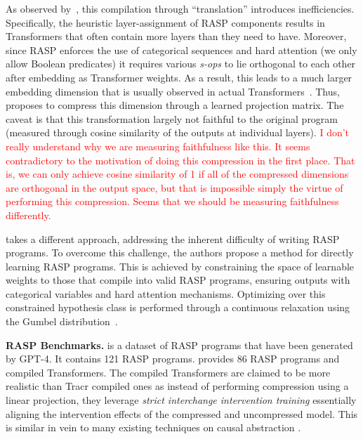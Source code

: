 \documentclass{article}
\begin{document}
As observed by~\cite{lindner_tracr_2023}, this compilation through ``translation'' introduces
inefficiencies. Specifically, the heuristic layer-assignment of RASP components results in
Transformers that often contain more layers than they need to have. Moreover, since RASP
enforces the use of categorical sequences and hard attention (we only allow Boolean
predicates) it requires various \textit{s-ops} to lie orthogonal to each other after
embedding as Transformer weights. As a result, this leads to a much larger embedding dimension
that is usually observed in actual Transformers~\citep{elhage_toy_2022}. 
Thus, \cite{lindner_tracr_2023} proposes to compress this dimension through a learned
projection matrix. The caveat is that this transformation largely not faithful to the original
program (measured through cosine similarity of the outputs at individual layers). 
{
\textcolor{red}{I don't really understand why we are measuring faithfulness like this. It
seems contradictory to the motivation of doing this compression in the first place. 
That is, we can only achieve cosine similarity of 1 if all of the compressed dimensions
are orthogonal in the output space, but that is impossible simply the virtue of performing
this compression. Seems that we should be measuring faithfulness differently.}
}

\cite{friedman_learning_2023} takes a different approach, addressing the inherent
difficulty of writing RASP programs. To overcome this challenge, the authors propose
a method for directly learning RASP programs. This is achieved by constraining the
space of learnable weights to those that compile into valid RASP programs, ensuring
outputs with categorical variables and hard attention mechanisms. Optimizing over this
constrained hypothesis class is performed through a continuous relaxation using the
Gumbel distribution~\citep{jang_categorical_2017}.

\textbf{RASP Benchmarks.} \cite{thurnherr_tracrbench_2024} is a dataset of RASP programs 
that have been generated by GPT-4. It contains 121 RASP programs. \cite{gupta_interpbench_2024}
provides 86 RASP programs and compiled Transformers. The compiled Transformers are claimed
to be more realistic than Tracr compiled ones as instead of performing compression using
a linear projection, they leverage \textit{strict interchange intervention training}
essentially aligning the intervention effects of the compressed and uncompressed model.
This is similar in vein to many existing techniques on causal abstraction
\cite{otsuka_equivalence_2022,zennaro_abstraction_2022,massidda_causal_2023}.
\end{document}
